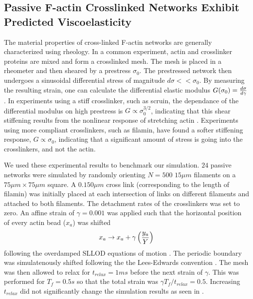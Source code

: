 \documentclass[12pt]{article}
\begin{document}
\subsection{Passive F-actin Crosslinked Networks Exhibit Predicted Viscoelasticity}
\par
The material properties of cross-linked F-actin networks are generally characterized using rheology. In a common
experiment, actin and crosslinker proteins are mixed and form a crosslinked mesh. The mesh is placed in a rheometer and then 
sheared by a prestress $\sigma_0$. The prestressed network then undergoes a sinusoidal differential stress of magnitude
$d\sigma<<\sigma_0$. By measuring the resulting strain, one can calculate the
differential elastic modulus $G(\sigma_0) = {d\sigma\over d\gamma}$. 
In experiments using a stiff crosslinker, such as scruin, the dependance of the differential modulus on high prestress 
is $G\propto\sigma_0^{3/2}$, indicating that this shear stiffening results from the nonlinear response of
stretching actin \cite{gardel2004,lin2010}. Experiments using more compliant crosslinkers, such as filamin, have found a softer
stiffening response, $G\propto\sigma_0$, indicating that a significant amount of stress is going into the crosslinkers,
and not the actin\cite{kasza2009}.
\par
We used these experimental results to benchmark our simulation. 
$24$ passive networks were simulated by randomly orienting $N = 500$ $15\mu m$ filaments on a $75\mu m \times 75\mu m$ square. A
$0.150\mu m$ cross link (corresponding to the length of filamin) was initially placed at each intersection of links on
different filaments and attached to both filaments. The detachment rates of the crosslinkers was set to zero. 
An affine strain of $\gamma=0.001$ was applied such that the horizontal position of every actin bead ($x_a$) was shifted 
\begin{equation}
  x_a \rightarrow x_a + \gamma \left( {y_a\over Y} \right)
  \label{eqn:sllod}
\end{equation} 
following the overdamped SLLOD equations of motion \cite{evans1984}. The periodic boundary was simulatenously shifted
following the the Lees-Edwards convention \cite{allen}. The mesh was then allowed to relax for $t_{relax} =
1 ms$ before the next strain of $\gamma$. This was performed for $T_f=0.5s$ so that the total strain was
$\gamma T_f/t_{relax}=0.5$. Increasing $t_{relax}$ did not significantly change the simulation
results as seen in .  
\par
\end{document}
